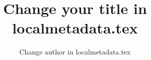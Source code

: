 

\title{Change your title in localmetadata.tex} %
\subtitle{}
\dedication{Change dedication in localmetadata.tex}
\author{Change author in localmetadata.tex}
\renewcommand{\lsISBN}{978-3-000000-00-0}                     
\renewcommand{\lsSeries}{dummyseries} %
\renewcommand{\lsSeriesNumber}{99} %
\renewcommand{\lsURL}{http://langsci-press.org/catalog/book/0} %
